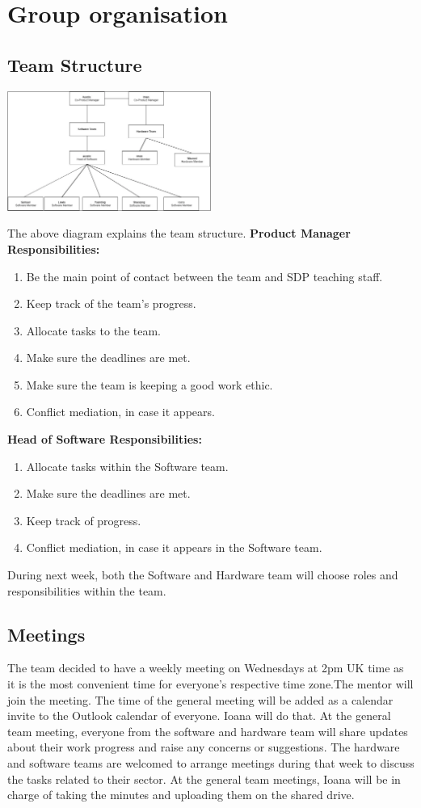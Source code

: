 \documentclass{article}
\begin{document}
\section{Group organisation}
\subsection{Team Structure}
\begin{center}
    \includegraphics [width=0.5\textwidth]{Team Structure.png}
\end{center}
The above diagram explains the team structure. 
\newline
\textbf{Product Manager Responsibilities: }
\begin{enumerate} 
    \item Be the main point of contact between the team  and SDP teaching staff. 
    \item Keep track of the team's progress.
    \item Allocate tasks to the team. 
    \item Make sure the deadlines are met. 
    \item Make sure the team is keeping a good work ethic. 
    \item Conflict mediation, in case it appears. 
\end{enumerate}
\textbf{Head of Software Responsibilities: }
\begin{enumerate} 
    \item Allocate tasks within the Software team.
    \item Make sure the deadlines are met. 
    \item Keep track of progress.
    \item Conflict mediation, in case it appears in the Software team. 
\end{enumerate}
During next week, both the Software and Hardware team will choose roles and responsibilities within the team.

\subsection{Meetings}
The team decided to have a weekly meeting on Wednesdays at 2pm UK time as it is the most convenient time for everyone's respective time zone.The mentor will join the meeting. The time of the general meeting will be added as a calendar invite to the Outlook calendar of everyone. Ioana will do that.  At the general team meeting, everyone from the software and hardware team will share updates about their work progress and raise any concerns or suggestions. The hardware and software teams are welcomed to arrange meetings during that week to discuss the tasks related to their sector. At the general team meetings, Ioana will be in charge of taking the minutes and uploading them on the shared drive. 
\end{document}
